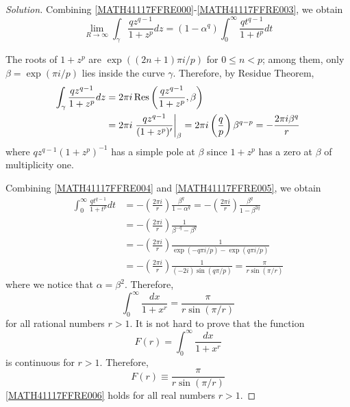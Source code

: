 \documentclass[11pt]{amsart}
\theoremstyle{remark}
\theoremstyle{definition}
\numberwithin{equation}{section}
\begin{document}
\begin{proof}[Solution]
    Combining \eqref{MATH41117FFRE000}-\eqref{MATH41117FFRE003}, we obtain
    \begin{equation}\label{MATH41117FFRE004}
        \lim_{R\to\infty} \int_{\gamma} \frac{q z^{q-1}}{1+z^p} dz
        = (1-\alpha^{q}) \int_0^\infty \frac{q t^{q-1}}{1+ t^p} dt
    \end{equation}

    The roots of $1+z^p$ are $\exp((2n+1)\pi i/p )$ for $0\le n < p$; among them, only $\beta = \exp(\pi i/p)$ lies inside the curve $\gamma$. Therefore, by Residue Theorem,
    \begin{equation}\label{MATH41117FFRE005}
        \begin{aligned}
            \int_{\gamma} \frac{q z^{q-1}}{1+z^p} dz
             & = 2\pi i \mathop{\mathrm{Res}}\nolimits \left(\frac{q z^{q-1}}{1+z^p}, \beta\right)
            \\
             & = 2\pi i \left.
            \frac{q z^{q-1}}{(1+z^p)'}
            \right|_\beta = 2\pi i \left(\frac{q}{p}\right) \beta^{q-p}
            = - \frac{2\pi i \beta^q}{r}
        \end{aligned}
    \end{equation}
    where $qz^{q-1}(1+z^p)^{-1}$ has a simple pole at $\beta$ since $1+z^p$ has a zero at $\beta$ of multiplicity one.

    Combining \eqref{MATH41117FFRE004} and \eqref{MATH41117FFRE005}, we obtain
    \[
        \begin{aligned}
            \int_0^\infty \frac{q t^{q-1}}{1+ t^p} dt
             & = -\left(\frac{2\pi i}{r}\right)
            \frac{\beta^q}{1-\alpha^q}
            = -\left(\frac{2\pi i}{r}\right)
            \frac{\beta^q}{1-\beta^{2q}}                   \\
             & = -\left(\frac{2\pi i}{r}\right)
            \frac{1}{\beta^{-q} - \beta^q}
            \\
             & = -\left(\frac{2\pi i}{r}\right)
            \frac{1}{\exp(-q \pi i /p) - \exp(q \pi i /p)} \\
             & = -\left(\frac{2\pi i}{r}\right) \frac{1}{
                (-2i)\sin(q \pi/p)} = \frac{\pi}{r \sin(\pi/r)}
        \end{aligned}
    \]
    where we notice that $\alpha = \beta^2$.
    Therefore,
    \begin{equation}\label{MATH41117FFRE006}
        \int_0^\infty \frac{dx}{1 + x^r} = \frac{\pi}{r \sin(\pi/r)}
    \end{equation}
    for all rational numbers $r>1$.
    It is not hard to prove that
    the function
    \[
        F(r) = \int_0^\infty \frac{dx}{1 + x^r}
    \]
    is continuous for $r > 1$. Therefore,
    \[
        F(r) \equiv \frac{\pi}{r \sin(\pi/r)}
    \]
    \eqref{MATH41117FFRE006} holds for all real numbers $r>1$.
\end{proof}
\end{document}
